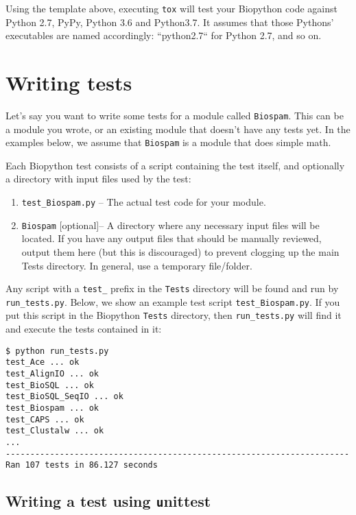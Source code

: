 Using the template above, executing \texttt{tox} will test your Biopython code against
Python 2.7, PyPy, Python 3.6 and Python3.7. It assumes that those
Pythons' executables are named accordingly: ``python2.7`` for Python 2.7, and so on.


\section{Writing tests}

Let's say you want to write some tests for a module called \verb|Biospam|.
This can be a module you wrote, or an existing module that doesn't have
any tests yet.  In the examples below, we assume that
\verb|Biospam| is a module that does simple math.

Each Biopython test consists of a script containing the test itself, and
optionally a directory with input files used by the test:

\begin{enumerate}
  \item \verb|test_Biospam.py| -- The actual test code for your module.
  \item \verb|Biospam| [optional]-- A directory where any necessary input files
    will be located. If you have any output files that should be manually
    reviewed, output them here (but this is discouraged) to prevent clogging
    up the main Tests directory. In general, use a temporary file/folder.
\end{enumerate}

Any script with a \verb|test_| prefix in the \verb|Tests| directory will be found and run by \verb|run_tests.py|. Below, we show an example test script \verb|test_Biospam.py|. If you put this script in the Biopython \verb|Tests| directory, then \verb|run_tests.py| will find it and execute the tests contained in it:

\begin{verbatim}
$ python run_tests.py
test_Ace ... ok
test_AlignIO ... ok
test_BioSQL ... ok
test_BioSQL_SeqIO ... ok
test_Biospam ... ok
test_CAPS ... ok
test_Clustalw ... ok
...
----------------------------------------------------------------------
Ran 107 tests in 86.127 seconds
\end{verbatim}

\subsection{Writing a test using {\texttt unittest}}

